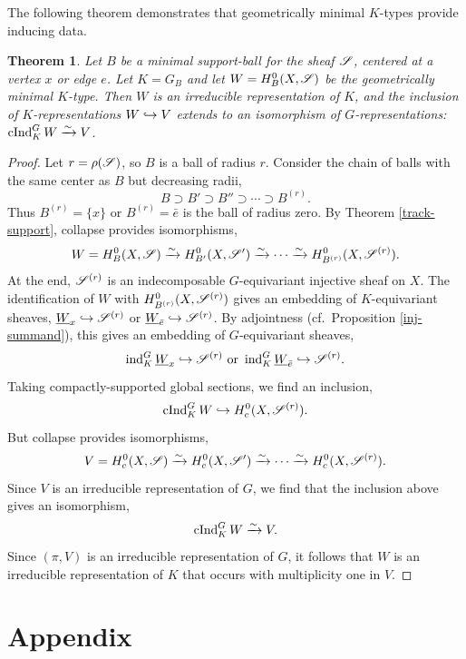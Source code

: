 \documentclass[letter]{amsart}
\newtheorem{thm}{Theorem}[section]
\theoremstyle{definition}
\theoremstyle{remark}
\numberwithin{thm}{section}
\numberwithin{equation}{section}
\newcommand{\constsheaf}[1]{{\underline{#1}}}
\begin{document}
The following theorem demonstrates that geometrically minimal $K$-types provide inducing data.
\begin{thm}
Let $B$ be a minimal support-ball for the sheaf ${\mathscr{S}}$, centered at a vertex $x$ or edge $e$.  Let $K = G_B$ and let $W = H_B^0(X, {\mathscr{S}})$ be the geometrically minimal $K$-type.  Then $W$ is an irreducible representation of $K$, and the inclusion of $K$-representations $W \hookrightarrow V$ extends to an isomorphism of $G$-representations:  $\operatorname{cInd}_K^G W \xrightarrow{\sim} V$.
\end{thm}
\begin{proof}
Let $r = \rho({\mathscr{S}})$, so $B$ is a ball of radius $r$.  Consider the chain of balls with the same center as $B$ but decreasing radii,
$$B \supset B' \supset B'' \supset \cdots \supset B^{(r)}.$$
Thus $B^{(r)} = \{ x \}$ or $B^{(r)} = \bar e$ is the ball of radius zero.  By Theorem \ref{track-support}, collapse provides isomorphisms,
$$W = H_B^0(X, {\mathscr{S}}) \xrightarrow{\sim} H_{B'}^0(X, {\mathscr{S}}') \xrightarrow{\sim} \cdots \xrightarrow{\sim} H_{B^{(r)}}^0(X, {\mathscr{S}}^{(r)}).$$
At the end, ${\mathscr{S}}^{(r)}$ is an indecomposable $G$-equivariant injective sheaf on $X$.  The identification of $W$ with $H_{B^{(r)}}^0(X, {\mathscr{S}}^{(r)})$ gives an embedding of $K$-equivariant sheaves, $\constsheaf{W}_x \Into \sheaf{S}^{(r)}$ or $\constsheaf{W}_{\bar e} \Into \sheaf{S}^{(r)}$.  By adjointness (cf.~Proposition \ref{inj-summand}), this gives an embedding of $G$-equivariant sheaves,
$$\ind_K^G \constsheaf{W}_{x} \Into \sheaf{S}^{(r)} \text{ or } \ind_K^G \constsheaf{W}_{\bar e} \Into \sheaf{S}^{(r)}.$$
Taking compactly-supported global sections, we find an inclusion,
$$\operatorname{cInd}_K^G W \hookrightarrow H_c^0(X, {\mathscr{S}}^{(r)}).$$
But collapse provides isomorphisms,
$$V = H_c^0(X, {\mathscr{S}}) \xrightarrow{\sim} H_c^0(X, {\mathscr{S}}') \xrightarrow{\sim} \cdots \xrightarrow{\sim} H_c^0(X, {\mathscr{S}}^{(r)}).$$
Since $V$ is an irreducible representation of $G$, we find that the inclusion above gives an isomorphism,
$$\operatorname{cInd}_K^G W \xrightarrow{\sim} V.$$
Since $(\pi, V)$ is an irreducible representation of $G$, it follows that $W$ is an irreducible representation of $K$ that occurs with multiplicity one in $V$.  
\end{proof}

\section*{Appendix}
\end{document}

